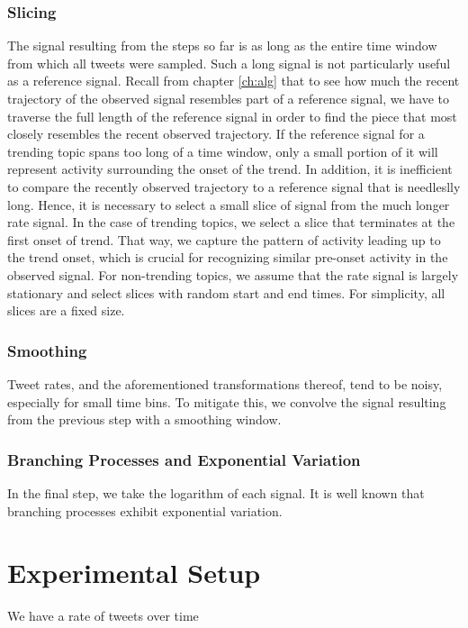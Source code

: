 \subsubsection{Slicing}
The signal resulting from the steps so far is as long as the entire time window
from which all tweets were sampled. Such a long signal is not particularly
useful as a reference signal. Recall from chapter \ref{ch:alg} that to see how
much the recent trajectory of the observed signal resembles part of a reference
signal, we have to traverse the full length of the reference signal in order to
find the piece that most closely resembles the recent observed trajectory. If
the reference signal for a trending topic spans too long of a time window, only
a small portion of it will represent activity surrounding the onset of the
trend. In addition, it is inefficient to compare the recently observed
trajectory to a reference signal that is needleslly long. Hence, it is necessary
to select a small slice of signal from the much longer rate signal. In the case
of trending topics, we select a slice that terminates at the first onset of
trend. That way, we capture the pattern of activity leading up to the trend
onset, which is crucial for recognizing similar pre-onset activity in the
observed signal. For non-trending topics, we assume that the rate signal is
largely stationary and select slices with random start and end times. For
simplicity, all slices are a fixed size.

\subsubsection{Smoothing}
Tweet rates, and the aforementioned transformations thereof, tend to be noisy,
especially for small time bins. To mitigate this, we convolve the signal
resulting from the previous step with a smoothing window.

\subsubsection{Branching Processes and Exponential Variation}
In the final step, we take the logarithm of each signal. It is well known that
branching processes exhibit exponential variation.\cite{Szabo}

\section{Experimental Setup}

We have a rate of tweets over time
